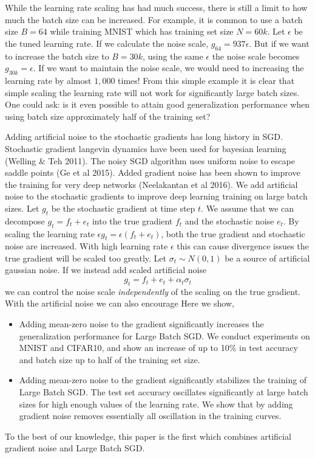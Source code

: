 \documentclass{article} %
\begin{document}
While the learning rate scaling has had much success, there is still a limit to how much the batch size can be increased.
For example, it is common to use a batch size $B = 64$ while training MNIST which has training set size $N = 60k$.
Let $\epsilon$ be the tuned learning rate.
If we calculate the noise scale, $g_{64} = 937 \epsilon$.
But if we want to increase the batch size to $B = 30k$, using the same $\epsilon$ the noise scale becomes $g_{30k} = \epsilon$.
If we want to maintain the noise scale, we would need to increasing the learning rate by almost $1,000$ times!
From this simple example it is clear that simple scaling the learning rate will not work for significantly large batch sizes. 
One could ask: is it even possible to attain good generalization performance when using batch size approximately half of the training set?

Adding artificial noise to the stochastic gradients has long history in SGD.
Stochastic gradient langevin dynamics have been used for bayesian learning (Welling \& Teh 2011).
The noisy SGD algorithm uses uniform noise to escape saddle points (Ge et al 2015).
Added gradient noise has been shown to improve the training for very deep networks (Neelakantan et al 2016).
We add artificial noise to the stochastic gradients to improve deep learning training on large batch sizes. 
Let $g_t$ be the stochastic gradient at time step $t$.
We assume that we can decompose $g_t = f_t + e_t$ into the true gradient $f_t$ and the stochastic noise $e_t$.
By scaling the learning rate $\epsilon g_t = \epsilon ( f_t + e_t )$, both the true gradient and stochastic noise are increased.
With high learning rate $\epsilon$ this can cause divergence issues the true gradient will be scaled too greatly.
Let $\sigma_t \sim N ( 0, 1 )$ be a source of artificial gaussian noise.
If we instead add scaled artificial noise
\begin{equation*}
g_t = f_t + e_t + \alpha_t \sigma_t
\end{equation*}
we can control the noise scale \emph{independently} of the scaling on the true gradient.
With the artificial noise we can also encourage 
Here we show,
\begin{itemize}
\item Adding mean-zero noise to the gradient significantly increases the generalization performance for Large Batch SGD.
We conduct experiments on MNIST and CIFAR10, and show an increase of up to 10\% in test accuracy and batch size up to half of the training set size.
\item Adding mean-zero noise to the gradient significantly stabilizes the training of Large Batch SGD.
The test set accuracy oscillates significantly at large batch sizes for high enough values of the learning rate.
We show that by adding gradient noise removes essentially all oscillation in the training curves.
\end{itemize}
To the best of our knowledge, this paper is the first which combines artificial gradient noise and Large Batch SGD.
\end{document}
